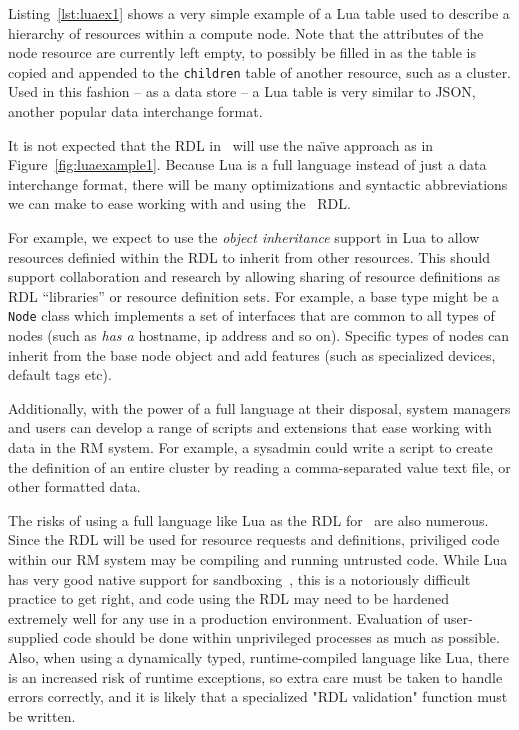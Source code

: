 Listing~\ref{lst:luaex1} shows a very simple example of
a Lua table used to describe a hierarchy of resources within
a compute node. Note that the attributes of the node resource
are currently left empty, to possibly be filled in as the
table is copied and appended to the {\tt children} table
of another resource, such as a cluster. Used in this fashion --
as a data store -- a Lua table is very similar to JSON, another
popular data interchange format.

It is not expected that the RDL in \ngrm\ will use the na\"{\i}ve
approach as in Figure~\ref{fig:luaexample1}. Because Lua is a full
language instead of just a data interchange format, there will be
many optimizations and syntactic abbreviations we can make to ease
working with and using the \ngrm\ RDL.

For example, we expect to use the \emph{object inheritance} support
in Lua to allow resources definied within the RDL to inherit from
other resources. This should support collaboration and research
by allowing sharing of resource definitions as RDL ``libraries''
or resource definition sets. For example, a base type might be
a {\tt Node} class which implements a set of interfaces that are
common to all types of nodes (such as \emph{has a} hostname, ip
address and so on). Specific types of nodes can inherit from the
base node object and add features (such as specialized devices,
default tags etc).

Additionally, with the power of a full language at their disposal,
system managers and users can develop a range of scripts and
extensions that ease working with data in the RM system. For
example, a sysadmin could write a script to create the definition
of an entire cluster by reading a comma-separated value text file,
or other formatted data.

The risks of using a full language like Lua as the RDL for \ngrm\
are also numerous. Since the RDL will be used for resource
requests and definitions, priviliged code within our RM system
may be compiling and running untrusted code. While Lua has very
good native support for sandboxing~\cite{LuaSandbox}, this is
a notoriously difficult practice to get right, and code using
the RDL may need to be hardened extremely well for any use in a
production environment. Evaluation of user-supplied code should
be done within unprivileged processes as much as possible. Also,
when using a dynamically typed, runtime-compiled language like Lua,
there is an increased risk of runtime exceptions, so extra care
must be taken to handle errors correctly, and it is likely that
a specialized "RDL validation" function must be written.

